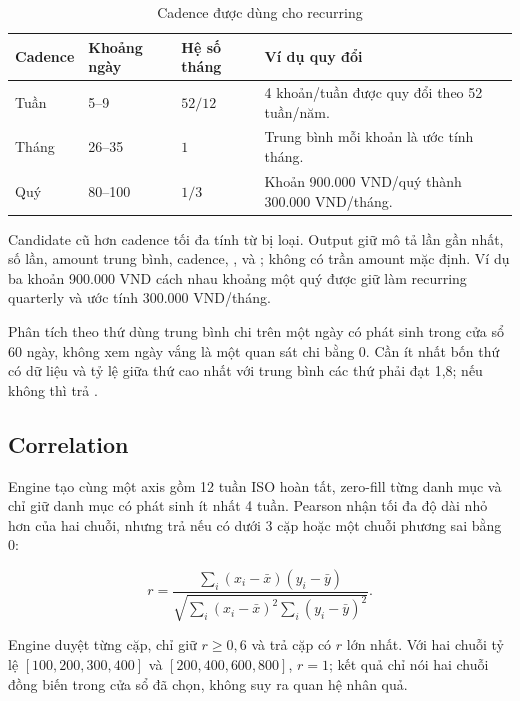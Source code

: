 \begin{table}[H]
  \centering
  \caption{Cadence được dùng cho recurring}
  \label{tab:app-cadences}
  \begin{tabularx}{0.9\textwidth}{@{}L{3.2cm}C{2.4cm}C{2.4cm}C{3.2cm}@{}}
    \toprule
    \textbf{Cadence} & \textbf{Khoảng ngày} & \textbf{Hệ số tháng} & \textbf{Ví dụ quy đổi} \\
    \midrule
    Tuần & 5--9 & $52/12$ & 4 khoản/tuần được quy đổi theo 52 tuần/năm. \\
    Tháng & 26--35 & $1$ & Trung bình mỗi khoản là ước tính tháng. \\
    Quý & 80--100 & $1/3$ & Khoản 900.000 VND/quý thành 300.000 VND/tháng. \\
    \bottomrule
  \end{tabularx}
\end{table}

Candidate cũ hơn cadence tối đa tính từ  bị loại. Output giữ mô tả lần gần nhất, số lần, amount trung bình, cadence, ,  và ; không có trần amount mặc định. Ví dụ ba khoản 900.000 VND cách nhau khoảng một quý được giữ làm recurring quarterly và ước tính 300.000 VND/tháng.

Phân tích theo thứ dùng trung bình chi trên một ngày có phát sinh trong cửa sổ 60 ngày, không xem ngày vắng là một quan sát chi bằng 0. Cần ít nhất bốn thứ có dữ liệu và tỷ lệ giữa thứ cao nhất với trung bình các thứ phải đạt 1,8; nếu không thì trả .

\subsection{Correlation}

Engine tạo cùng một axis gồm 12 tuần ISO hoàn tất, zero-fill từng danh mục và chỉ giữ danh mục có phát sinh ít nhất 4 tuần. Pearson nhận tối đa độ dài nhỏ hơn của hai chuỗi, nhưng trả  nếu có dưới 3 cặp hoặc một chuỗi phương sai bằng 0:

\begin{equation}
  r=\frac{\sum_i(x_i-\bar x)(y_i-\bar y)}
  {\sqrt{\sum_i(x_i-\bar x)^2\sum_i(y_i-\bar y)^2}}.
\end{equation}

Engine duyệt từng cặp, chỉ giữ $r\geq0{,}6$ và trả cặp có $r$ lớn nhất. Với hai chuỗi tỷ lệ $[100,200,300,400]$ và $[200,400,600,800]$, $r=1$; kết quả chỉ nói hai chuỗi đồng biến trong cửa sổ đã chọn, không suy ra quan hệ nhân quả.

